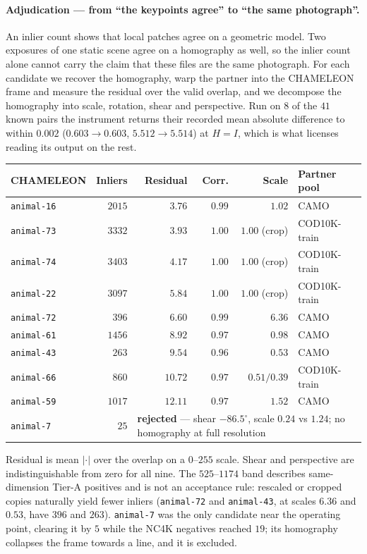 \documentclass{article}
\begin{document}
\paragraph{Adjudication --- from ``the keypoints agree'' to ``the same photograph''.} An inlier count
shows that local patches agree on a geometric model. Two exposures of one static scene agree on a
homography as well, so the inlier count alone cannot carry the claim that these files are the same
photograph. For each candidate we recover the homography, warp the partner into the CHAMELEON frame
and measure the residual over the valid overlap, and we decompose the homography into scale,
rotation, shear and perspective. Run on $8$ of the $41$ known pairs the instrument returns their
recorded mean absolute difference to within $0.002$ ($0.603 \to 0.603$, $5.512 \to 5.514$) at
$H = I$, which is what licenses reading its output on the rest.

\begin{center}\small
\setlength{\tabcolsep}{4pt}
\begin{tabular}{lrrrrl}
\toprule
CHAMELEON & Inliers & Residual & Corr. & Scale & Partner pool \\
\midrule
\texttt{animal-16} & $2015$ & $3.76$ & $0.99$ & $1.02$ & CAMO \\
\texttt{animal-73} & $3332$ & $3.93$ & $1.00$ & $1.00$ (crop) & COD10K-train \\
\texttt{animal-74} & $3403$ & $4.17$ & $1.00$ & $1.00$ (crop) & COD10K-train \\
\texttt{animal-22} & $3097$ & $5.84$ & $1.00$ & $1.00$ (crop) & COD10K-train \\
\texttt{animal-72} & $396$ & $6.60$ & $0.99$ & $6.36$ & CAMO \\
\texttt{animal-61} & $1456$ & $8.92$ & $0.97$ & $0.98$ & CAMO \\
\texttt{animal-43} & $263$ & $9.54$ & $0.96$ & $0.53$ & CAMO \\
\texttt{animal-66} & $860$ & $10.72$ & $0.97$ & $0.51/0.39$ & COD10K-train \\
\texttt{animal-59} & $1017$ & $12.11$ & $0.97$ & $1.52$ & CAMO \\
\midrule
\texttt{animal-7} & $25$ & \multicolumn{4}{l}{\textbf{rejected} --- shear $-86.5^\circ$, scale $0.24$ vs $1.24$; no homography at full resolution} \\
\bottomrule
\end{tabular}
\end{center}

Residual is mean $|{\cdot}|$ over the overlap on a $0$--$255$ scale. Shear and perspective are
indistinguishable from zero for all nine. The $525$--$1174$ band describes same-dimension Tier-A
positives and is not an acceptance rule: rescaled or cropped copies naturally yield fewer inliers
(\texttt{animal-72} and \texttt{animal-43}, at scales $6.36$ and $0.53$, have $396$ and $263$).
\texttt{animal-7} was the only candidate near the operating point, clearing it by $5$ while the NC4K
negatives reached $19$; its homography collapses the frame towards a line, and it is excluded.
\end{document}
